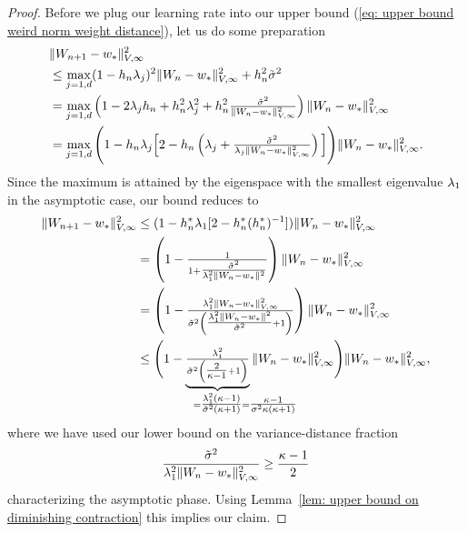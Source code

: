\begin{proof}
	Before we plug our learning rate into our upper bound (\ref{eq: upper bound
	weird norm weight distance}), let us do some preparation 
	\begin{align}
		\nonumber
		&\|W_{n+1} -w_*\|_{V,\infty}^2\\
		\nonumber
		&\le \max_{j=1,d} (1-h_n\lambda_j)^2\|W_n -w_*\|_{V,\infty}^2
		+ h_n^2 \tilde{\sigma}^2\\
		\label{eq: upper bound useful for rate of convergence}
		&= \max_{j=1,d}\left(1- 2\lambda_jh_n + h_n^2\lambda_j^2
			+h_n^2\tfrac{\tilde{\sigma}^2}{\|W_n-w_*\|_{V,\infty}^2}
		\right)\|W_n-w_*\|_{V,\infty}^2\\
		\nonumber
		&= \max_{j=1,d}\Bigg(1- h_n \lambda_j\Big[2 - h_n \left(
			\lambda_j + \tfrac{\tilde{\sigma}^2}{\lambda_j\|W_n-w_*\|_{V,\infty}^2}
		\right)\Big] \Bigg)\|W_n-w_*\|_{V,\infty}^2.
	\end{align}
	Since the maximum is attained by the eigenspace with the smallest eigenvalue \(\lambda_1\)
	in the asymptotic case, our bound reduces to
	\begin{align*}
		\|\Weights_{n+1} -\minimum\|_{V,\infty}^2
		&\le (1- \lr_n^* \hesseEV_1[2-\lr_n^*(\lr_n^*)^{-1}])\|\Weights_n-\minimum\|_{V,\infty}^2\\
		&= \left(1- \tfrac{1}{1+ \tfrac{\tilde{\stdBound}^2}{\hesseEV_1^2\|\Weights_n-\minimum\|^2}}\right)
		\|\Weights_n-\minimum\|_{V,\infty}^2\\
		&= \left(1- \tfrac{
			\hesseEV_1^2 \|\Weights_n-\minimum\|_{V,\infty}^2
		}{
			\tilde{\stdBound}^2
			\left(\tfrac{\hesseEV_1^2\|\Weights_n-\minimum\|^2}{\tilde{\stdBound}^2}+1\right)
		}\right)
		\|\Weights_n-\minimum\|_{V,\infty}^2\\
		&\le \Bigg(
		1- \underbrace{\tfrac{
			\hesseEV_1^2
		}{
			\tilde{\stdBound}^2
			\left(\tfrac{2}{\condition -1}+1\right)
		}}_{
			=\tfrac{\hesseEV_1^2(\condition-1)}{\tilde{\stdBound}^2(\condition+1)}
			\mathrlap{=\tfrac{\condition-1}{\stdBound^2\condition(\condition+1)}}
		}
		\|\Weights_n-\minimum\|_{V,\infty}^2
		\Bigg)
		\|\Weights_n-\minimum\|_{V,\infty}^2,
	\end{align*}
	where we have used our lower bound on the variance-distance fraction
	\begin{align*}
		\frac{\tilde{\sigma}^2}{
			\lambda_1^2\|W_n-w_*\|_{V,\infty}^2
		}
		\ge \frac{\kappa-1}{2}
	\end{align*}
	characterizing the asymptotic phase. Using Lemma~\ref{lem: upper bound on diminishing contraction}
	this implies our claim.


\end{proof}
